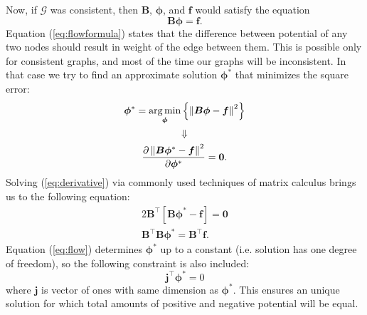 \documentclass[lmodern, utf8, diplomski, numeric]{fer}
\newcommand{\matr}[1]{\mathbold{#1}}
\newcommand{\graph}[1]{\mathcal{#1}}
\newcommand{\T}{\top}
\DeclareMathOperator*{\argmin}{arg\min}
\begin{document}
  Now, if $\graph{G}$ was consistent, then $\matr{B}$, $\matr{\phi}$, and $\matr{f}$ would satisfy the equation
  \begin{equation}
  \label{eq:flowformula}
  \matr{B} \matr{\phi} = \matr{f}.
  \end{equation}
  Equation (\ref{eq:flowformula}) states that the difference between potential of any two nodes should result in weight of the edge between them.
  This is possible only for consistent graphs, and most of the time our graphs will be inconsistent.
  In that case we try to find an approximate solution $\matr{\phi^*}$ that minimizes the square error:
  \begin{gather}
  \matr{\phi^*} = \argmin_{\matr{\phi}} \left\{ \left \lVert \matr{B} \matr{\phi} - \matr{f}\textsl{} \right \rVert ^ 2 \right\} \nonumber \\ 
  \Downarrow \nonumber \\
  \label{eq:derivative}
  \frac{\partial \left \lVert \matr{B} \matr{\phi^*} - \matr{f} \right \rVert ^ 2}{\partial \matr{\phi^*}} = \mathbf{0}.
  \end{gather}
  Solving (\ref{eq:derivative}) via commonly used techniques of matrix calculus brings us to the following equation:
  \begin{gather}
  \label{eq:flow}
  2 \matr{B}^\T \left[\matr{B} \matr{\phi^*} - \matr{f} \right] = \mathbf{0} \nonumber \\
  \matr{B}^\T \matr{B} \matr{\phi^*} = \matr{B}^\T \matr{f}.
  \end{gather}
  Equation (\ref{eq:flow}) determines $\matr{\phi^*}$ up to a constant (i.e. solution has one degree of freedom), so the following constraint is also included:
  \begin{equation}
  \label{eq:sumiszero}
  \matr{j}^\T \matr{\phi^*} = 0
  \end{equation}
  where $\matr{j}$ is vector of ones with same dimension as $\matr{\phi^*}$.
  This ensures an unique solution for which total amounts of positive and negative potential will be equal.
  
\end{document}
